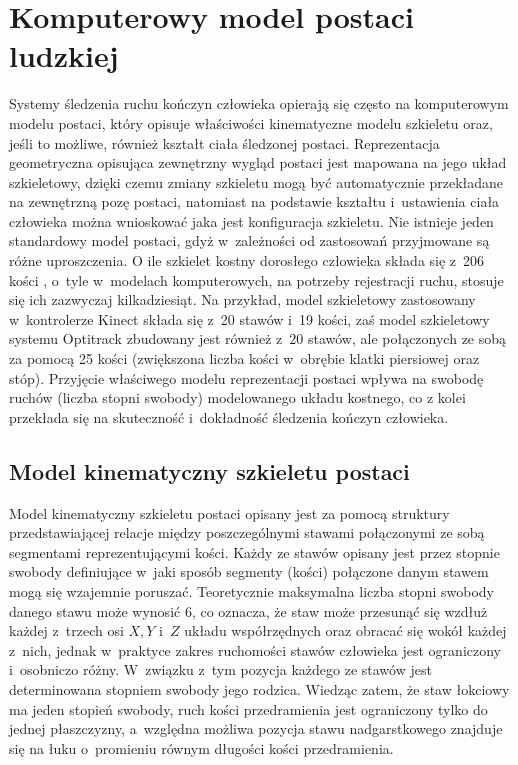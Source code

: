 \section{Komputerowy model postaci ludzkiej} \label{chap:bodyRep}
Systemy śledzenia ruchu kończyn człowieka opierają się często na komputerowym modelu postaci, który opisuje właściwości kinematyczne modelu szkieletu oraz, jeśli to możliwe, również kształt ciała śledzonej postaci. Reprezentacja geometryczna opisująca zewnętrzny wygląd postaci jest mapowana na jego układ szkieletowy, dzięki czemu zmiany szkieletu mogą być automatycznie przekładane na zewnętrzną pozę postaci, natomiast na podstawie kształtu i~ustawienia ciała człowieka można wnioskować jaka jest konfiguracja szkieletu. 
Nie istnieje jeden standardowy model postaci, gdyż w~zależności od zastosowań przyjmowane są różne uproszczenia. O ile szkielet kostny dorosłego człowieka składa się z~206 kości \cite{Lasinski1990}, o~tyle w~modelach komputerowych, na potrzeby rejestracji ruchu, stosuje się ich zazwyczaj kilkadziesiąt. Na przykład, model szkieletowy zastosowany w~kontrolerze Kinect składa się z~20 stawów i~19 kości{}, zaś model szkieletowy systemu Optitrack zbudowany jest również z~20 stawów, ale połączonych ze sobą za pomocą 25 kości (zwiększona liczba kości w~obrębie klatki piersiowej oraz stóp). Przyjęcie właściwego modelu reprezentacji postaci wpływa na swobodę ruchów (liczba stopni swobody) modelowanego układu kostnego, co z kolei przekłada się na skuteczność i~dokładność śledzenia kończyn człowieka.
											
\subsection{Model kinematyczny szkieletu postaci}
Model kinematyczny szkieletu postaci opisany jest za pomocą struktury przedstawiającej relacje między poszczególnymi stawami połączonymi ze sobą segmentami reprezentującymi kości. Każdy ze stawów opisany jest przez stopnie swobody definiujące w~jaki sposób segmenty (kości) połączone danym stawem mogą się wzajemnie poruszać. Teoretycznie maksymalna liczba stopni swobody danego stawu może wynosić 6, co oznacza, że staw może przesunąć się wzdłuż każdej z~trzech osi $X, Y$ i~$Z$ układu współrzędnych oraz obracać się wokół każdej z~nich, jednak w~praktyce zakres ruchomości stawów człowieka jest ograniczony i~osobniczo różny. W~związku z~tym pozycja każdego ze stawów jest determinowana stopniem swobody jego rodzica. Wiedząc zatem, że staw łokciowy ma jeden stopień swobody, ruch kości przedramienia jest ograniczony tylko do jednej płaszczyzny, a~względna możliwa pozycja stawu nadgarstkowego znajduje się na łuku o~promieniu równym długości kości przedramienia.

